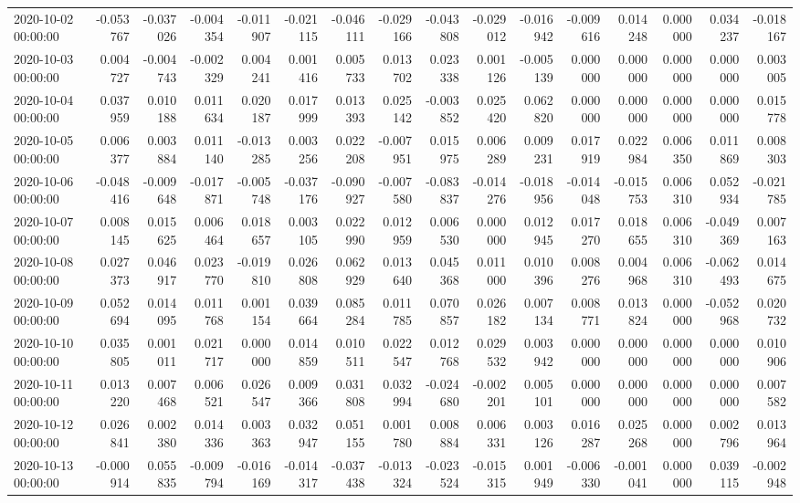 \begin{tabular}{lrrrrrrrrrrrrrrr}
2020-10-02 00:00:00 & -0.053767 & -0.037026 & -0.004354 & -0.011907 & -0.021115 & -0.046111 & -0.029166 & -0.043808 & -0.029012 & -0.016942 & -0.009616 & 0.014248 & 0.000000 & 0.034237 & -0.018167 \\
2020-10-03 00:00:00 & 0.004727 & -0.004743 & -0.002329 & 0.004241 & 0.001416 & 0.005733 & 0.013702 & 0.023338 & 0.001126 & -0.005139 & 0.000000 & 0.000000 & 0.000000 & 0.000000 & 0.003005 \\
2020-10-04 00:00:00 & 0.037959 & 0.010188 & 0.011634 & 0.020187 & 0.017999 & 0.013393 & 0.025142 & -0.003852 & 0.025420 & 0.062820 & 0.000000 & 0.000000 & 0.000000 & 0.000000 & 0.015778 \\
2020-10-05 00:00:00 & 0.006377 & 0.003884 & 0.011140 & -0.013285 & 0.003256 & 0.022208 & -0.007951 & 0.015975 & 0.006289 & 0.009231 & 0.017919 & 0.022984 & 0.006350 & 0.011869 & 0.008303 \\
2020-10-06 00:00:00 & -0.048416 & -0.009648 & -0.017871 & -0.005748 & -0.037176 & -0.090927 & -0.007580 & -0.083837 & -0.014276 & -0.018956 & -0.014048 & -0.015753 & 0.006310 & 0.052934 & -0.021785 \\
2020-10-07 00:00:00 & 0.008145 & 0.015625 & 0.006464 & 0.018657 & 0.003105 & 0.022990 & 0.012959 & 0.006530 & 0.000000 & 0.012945 & 0.017270 & 0.018655 & 0.006310 & -0.049369 & 0.007163 \\
2020-10-08 00:00:00 & 0.027373 & 0.046917 & 0.023770 & -0.019810 & 0.026808 & 0.062929 & 0.013640 & 0.045368 & 0.011000 & 0.010396 & 0.008276 & 0.004968 & 0.006310 & -0.062493 & 0.014675 \\
2020-10-09 00:00:00 & 0.052694 & 0.014095 & 0.011768 & 0.001154 & 0.039664 & 0.085284 & 0.011785 & 0.070857 & 0.026182 & 0.007134 & 0.008771 & 0.013824 & 0.000000 & -0.052968 & 0.020732 \\
2020-10-10 00:00:00 & 0.035805 & 0.001011 & 0.021717 & 0.000000 & 0.014859 & 0.010511 & 0.022547 & 0.012768 & 0.029532 & 0.003942 & 0.000000 & 0.000000 & 0.000000 & 0.000000 & 0.010906 \\
2020-10-11 00:00:00 & 0.013220 & 0.007468 & 0.006521 & 0.026547 & 0.009366 & 0.031808 & 0.032994 & -0.024680 & -0.002201 & 0.005101 & 0.000000 & 0.000000 & 0.000000 & 0.000000 & 0.007582 \\
2020-10-12 00:00:00 & 0.026841 & 0.002380 & 0.014336 & 0.003363 & 0.032947 & 0.051155 & 0.001780 & 0.008884 & 0.006331 & 0.003126 & 0.016287 & 0.025268 & 0.000000 & 0.002796 & 0.013964 \\
2020-10-13 00:00:00 & -0.000914 & 0.055835 & -0.009794 & -0.016169 & -0.014317 & -0.037438 & -0.013324 & -0.023524 & -0.015315 & 0.001949 & -0.006330 & -0.001041 & 0.000000 & 0.039115 & -0.002948 \\

\end{tabular}
